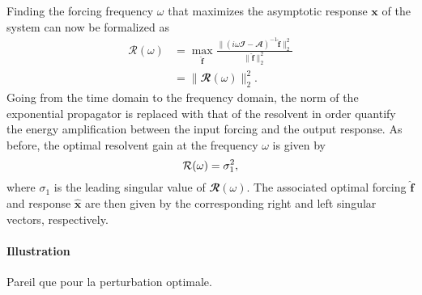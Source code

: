     Finding the forcing frequency $\omega$ that maximizes the asymptotic response $\mathbf{x}$ of the system can now be formalized as
    \begin{equation}
      \begin{aligned}
        \mathcal{R}(\omega) & = \max_{\hat{\mathbf{f}}} \displaystyle \frac{\| \left( i \omega \mathbfcal{I} - \mathbfcal{A} \right)^{-1} \hat{\mathbf{f}} \|_2^2}{\| \hat{\mathbf{f}} \|_2^2} \\
        & = \| \mathbfcal{R}(\omega) \|_2^2.
      \end{aligned}
      \label{eq: theory -- resolvent norm}
    \end{equation}
    Going from the time domain to the frequency domain, the norm of the exponential propagator is replaced with that of the resolvent in order quantify the energy amplification between the input forcing and the output response. As before, the optimal resolvent gain at the frequency $\omega$ is given by
    \begin{equation}
      \mathcal{R}(\omega) = \sigma_1^2,
      \notag
    \end{equation}
    where $\sigma_1$ is the leading singular value of $\mathbfcal{R}(\omega)$. The associated optimal forcing $\hat{\mathbf{f}}$ and response $\hat{\mathbf{x}}$ are then given by the corresponding right and left singular vectors, respectively.

    \paragraph{Illustration}

    {\color{red} Pareil que pour la perturbation optimale.}
